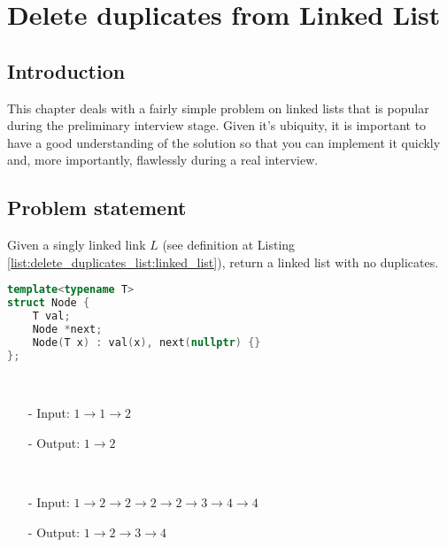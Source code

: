 %

\chapter{Delete duplicates from Linked List}
\label{ch:delete_duplicates_list}
\section*{Introduction}
This chapter deals with a fairly simple problem on linked lists that is popular during the preliminary interview stage. Given it's ubiquity, it is important to have a good understanding of the solution so that you can implement it quickly and, more importantly, flawlessly during a real interview. 
\section{Problem statement}
\begin{exercise}
Given a singly linked link $L$ (see definition at Listing \ref{list:delete_duplicates_list:linked_list}), return a linked list with no duplicates.
\end{exercise}
\begin{lstlisting}[language=c++, caption=Singly Linked list definition,label=list:delete_duplicates_list:linked_list]
template<typename T>
struct Node {
    T val;
    Node *next;
    Node(T x) : val(x), next(nullptr) {}
};
\end{lstlisting}

\begin{example}
	\hfill \\
	\begin{itemize}
		\item[-] Input: $1 \rightarrow 1 \rightarrow 2$
		\item[-] Output: $1 \rightarrow 2$
	\end{itemize}
\end{example}

\begin{example}
	\hfill \\
	\begin{itemize}
		\item[-] Input: $1 \rightarrow  2 \rightarrow  2 \rightarrow  2 \rightarrow  2 \rightarrow  3 \rightarrow  4 \rightarrow  4 $
		\item[-] Output: $1 \rightarrow  2 \rightarrow 3 \rightarrow  4$
	\end{itemize}
\end{example}

